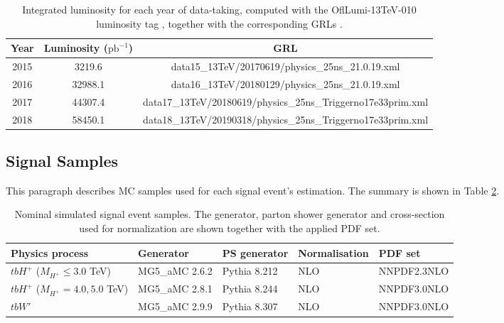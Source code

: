 \begin{table}[H]
  \centering
  \begin{tabular*}{150mm}{@{\extracolsep{\fill}}ccc}
    \hline\hline
    Year & Luminosity ($\text{pb}^{-1}$) & GRL\\
    \hline
    2015 & 3219.6  & data15\_13TeV/20170619/physics\_25ns\_21.0.19.xml\\
    2016 & 32988.1 & data16\_13TeV/20180129/physics\_25ns\_21.0.19.xml\\
    2017 & 44307.4 & data17\_13TeV/20180619/physics\_25ns\_Triggerno17e33prim.xml\\
    2018 & 58450.1 & data18\_13TeV/20190318/physics\_25ns\_Triggerno17e33prim.xml\\
    \hline\hline
  \end{tabular*}
  \caption{Integrated luminosity for each year of data-taking, computed with the OflLumi-13TeV-010 luminosity
  tag \cite{LuminosityForPhysis}, together with the corresponding GRLs \cite{GoodRunListRun2}.}
  \label{tab:GRLForData}
\end{table}

\subsection{Signal Samples}
\label{subsec:SignalSample}
This paragraph describes MC samples used for each signal event's estimation. The summary is shown in Table \ref{tab:SigSampleSummary}.

\begin{table}[H]
  \centering
  \begin{tabular*}{160mm}{@{\extracolsep{\fill}}lllll}
    \hline\hline
    Physics process & Generator & PS generator & Normalisation & PDF set\\
    \hline
    $tbH^{+}$ ($M_{H^{+}}\leq3.0$ TeV)  & MG5\_aMC 2.6.2 & Pythia 8.212 & NLO & NNPDF2.3NLO\\
    $tbH^{+}$ ($M_{H^{+}}=4.0,5.0$ TeV) & MG5\_aMC 2.8.1 & Pythia 8.244 & NLO & NNPDF3.0NLO\\
    $tbW'$                              & MG5\_aMC 2.9.9 & Pythia 8.307 & NLO & NNPDF3.0NLO\\
    \hline\hline
  \end{tabular*}
  \caption{Nominal simulated signal event samples. The generator, parton shower generator and cross-section used for normalization are shown together with the applied PDF set.}
  \label{tab:SigSampleSummary}
\end{table}

